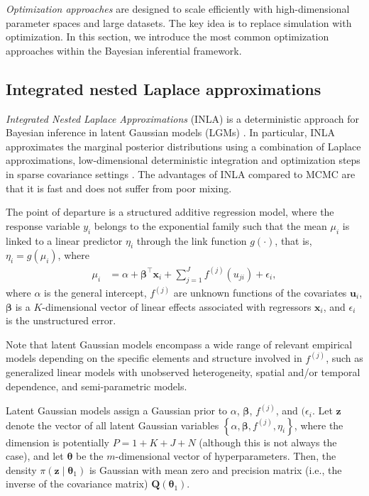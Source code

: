 \textit{Optimization approaches} are designed to scale efficiently with high-dimensional parameter spaces and large datasets. The key idea is to replace simulation with optimization. In this section, we introduce the most common optimization approaches within the Bayesian inferential framework. 

\subsection{Integrated nested Laplace approximations}\label{sec15_21}
\textit{Integrated Nested Laplace Approximations} (INLA) is a deterministic approach for Bayesian inference in latent Gaussian models (LGMs) \cite{rue2009approximate}. In particular, INLA approximates the marginal posterior distributions using a combination of Laplace approximations, low-dimensional deterministic integration and optimization steps in sparse covariance settings \cite{rue2017bayesian}. The advantages of INLA compared to MCMC are that it is fast and does not suffer from poor mixing.

The point of departure is a structured additive regression model, where the response variable $y_i$ belongs to the exponential family such that the mean $\mu_i$ is linked to a linear predictor $\eta_i$ through the link function $g(\cdot)$, that is, $\eta_i=g(\mu_i)$, where
\begin{align*}
	\mu_i&=\alpha+\boldsymbol{\beta}^{\top}\boldsymbol{x}_{i}+\sum_{j=1}^{J}f^{(j)}(u_{ji})+\epsilon_{i},
\end{align*}
where $\alpha$ is the general intercept, $f^{(j)}$ are unknown functions of the covariates $\boldsymbol{u}_i$, $\boldsymbol{\beta}$ is a $K$-dimensional vector of linear effects associated with regressors $\boldsymbol{x}_i$, and $\epsilon_{i}$ is the unstructured error.

Note that latent Gaussian models encompass a wide range of relevant empirical models depending on the specific elements and structure involved in $f^{(j)}$, such as generalized linear models with unobserved heterogeneity, spatial and/or temporal dependence, and semi-parametric models.

Latent Gaussian models assign a Gaussian prior to $\alpha$, $\boldsymbol{\beta}$, $f^{(j)}$, and $(\epsilon_{i}$. Let $\boldsymbol{z}$ denote the vector of all latent Gaussian variables $\left\{\alpha, \boldsymbol{\beta}, f^{(j)},\eta_{i}\right\}$, where the dimension is potentially \( P = 1 + K + J + N \) (although this is not always the case), and let $\boldsymbol{\theta}$ be the $m$-dimensional vector of hyperparameters. Then, the density $\pi(\boldsymbol{z} \mid \boldsymbol{\theta}_1)$ is Gaussian with mean zero and precision matrix (i.e., the inverse of the covariance matrix) $\boldsymbol{Q}(\boldsymbol{\theta}_1)$.

